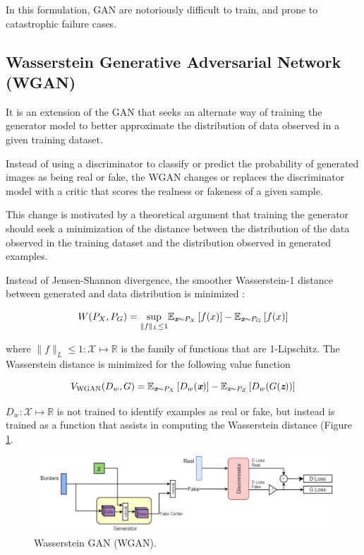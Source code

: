 \documentclass{article} %
\newcommand{\e}{\mathbb E}
\begin{document}
In this formulation, GAN are notoriously difficult to train, and prone to catastrophic failure cases.

\subsection{Wasserstein Generative Adversarial Network (WGAN)}
It is an extension of the GAN that seeks an alternate way of training the generator model to better approximate the distribution of data observed in a given training dataset.

Instead of using a discriminator to classify or predict the probability of generated images as being real or fake, the WGAN changes or replaces the discriminator model with a critic that scores the realness or fakeness of a given sample.

This change is motivated by a theoretical argument that training the generator should seek a minimization of the distance between the distribution of the data observed in the training dataset and the distribution observed in generated examples.

Instead of Jensen-Shannon divergence, the smoother Wasserstein-1 distance between generated and data distribution is minimized \cite{arjovsky2017}:

\begin{equation}
    W(P_X,P_G) = \underset{\| f\| _L \leq 1}{\textrm{sup}} \e_{\textit{\textbf{x}}\sim P_X} \left[f(x)\right] - \e_{\textit{\textbf{x}}\sim P_G} \left[f(x)\right]
\end{equation}

where $\| f \| _L \leq 1 : \mathcal{X} \mapsto \mathbb{R}$ is the family of functions that are 1-Lipschitz. The Wasserstein distance is minimized for the following value function

\begin{equation}
    V_\textrm{WGAN}(D_w,G) = \e_{\textit{\textbf{x}}\sim P_X}\left[D_w(\textit{\textbf{x}})\right] - \e_{\textit{\textbf{z}}\sim P_Z}\left[D_w(G(\textit{\textbf{z}}))\right]
\end{equation}

$D_w : \mathcal{X} \mapsto \mathbb{R}$ is not trained to identify examples as real or fake, but instead is trained as a function that assists in computing the Wasserstein distance (Figure \ref{fig:wgan}.

\begin{figure}[h]
    \includegraphics[scale=0.36]{images/model_basic2.jpg}
    \centering
    \caption{Wasserstein GAN (WGAN).}
    \label{fig:wgan}
\end{figure}
\end{document}
